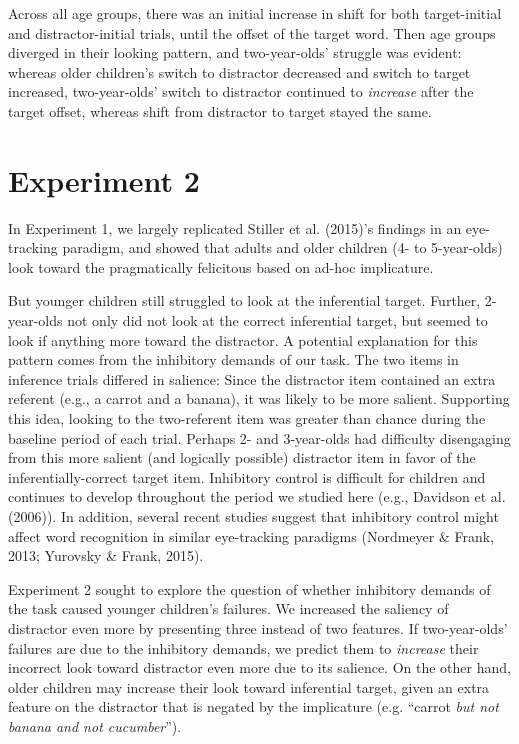 \documentclass[a4paper,man,apacite,floatsintext]{apa6}
\begin{document}
Across all age groups, there was an initial increase in shift for both
target-initial and distractor-initial trials, until the offset of the
target word. Then age groups diverged in their looking pattern, and
two-year-olds' struggle was evident: whereas older children's switch to
distractor decreased and switch to target increased, two-year-olds'
switch to distractor continued to \emph{increase} after the target
offset, whereas shift from distractor to target stayed the same.

\section{Experiment 2}\label{experiment-2}

In Experiment 1, we largely replicated Stiller et al. (2015)'s findings
in an eye-tracking paradigm, and showed that adults and older children
(4- to 5-year-olds) look toward the pragmatically felicitous based on
ad-hoc implicature.

But younger children still struggled to look at the inferential target.
Further, 2-year-olds not only did not look at the correct inferential
target, but seemed to look if anything more toward the distractor. A
potential explanation for this pattern comes from the inhibitory demands
of our task. The two items in inference trials differed in salience:
Since the distractor item contained an extra referent (e.g., a carrot
and a banana), it was likely to be more salient. Supporting this idea,
looking to the two-referent item was greater than chance during the
baseline period of each trial. Perhaps 2- and 3-year-olds had difficulty
disengaging from this more salient (and logically possible) distractor
item in favor of the inferentially-correct target item. Inhibitory
control is difficult for children and continues to develop throughout
the period we studied here (e.g., Davidson et al. (2006)). In addition,
several recent studies suggest that inhibitory control might affect word
recognition in similar eye-tracking paradigms (Nordmeyer \& Frank, 2013;
Yurovsky \& Frank, 2015).

Experiment 2 sought to explore the question of whether inhibitory
demands of the task caused younger children's failures. We increased the
saliency of distractor even more by presenting three instead of two
features. If two-year-olds' failures are due to the inhibitory demands,
we predict them to \emph{increase} their incorrect look toward
distractor even more due to its salience. On the other hand, older
children may increase their look toward inferential target, given an
extra feature on the distractor that is negated by the implicature (e.g.
``carrot \emph{but not banana and not cucumber}'').
\end{document}
